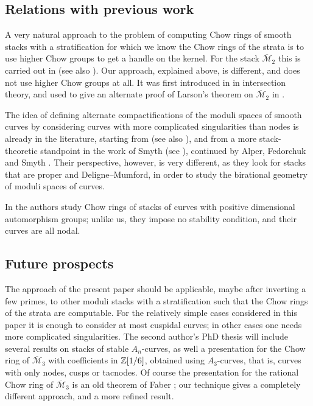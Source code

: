 \documentclass[a4paper, 10pt]{amsart}
\numberwithin{equation}{section}
\numberwithin{subsection}{section}
\theoremstyle{definition}
\theoremstyle{remark}
\renewcommand{\mathcal}{\mathscr}
\newcommand\cM{\mathcal{M}} \newcommand\cN{\mathcal{N}}
\newcommand{\Mbar}{\overline{\cM}}
\begin{document}
	
\subsection*{Relations with previous work} A very natural approach to the problem of computing Chow rings of smooth stacks with a stratification for which we know the Chow rings of the strata is to use higher Chow groups to get a handle on the kernel. For the stack $\Mbar_{2}$ this is carried out in \cite{Lars} (see also \cite{bae-schmitt-1, bae-schmitt-2}). Our approach, explained above, is different, and does not use higher Chow groups at all. It was first introduced in \cite{fulghesu} in intersection theory, and used to give an alternate proof of Larson's theorem on $\Mbar_{2}$ in \cite{DLV}.

The idea of defining alternate compactifications of the moduli spaces of smooth curves by considering curves with more complicated singularities than nodes is already in the literature, starting from \cite{schubert} (see also \cite{hassett-hyeon-1, hassett-hyeon-2}), and from a more stack-theoretic standpoint in the work of Smyth (see \cite{smyth-survey}), continued by Alper, Fedorchuk and Smyth \cite{alper-fedorchuk-smyth-1, alper-fedorchuk-smyth-2, alper-fedorchuk-smyth-3, alper-fedorchuk-smyth-4}. Their perspective, however, is very different, as they look for stacks that are proper and Deligne--Mumford, in order to study the birational geometry of moduli spaces of curves.

In \cite{fulghesu, bae-schmitt-1, bae-schmitt-1} the authors study Chow rings of stacks of curves with positive dimensional automorphism groups; unlike us, they impose no stability condition, and their curves are all nodal.

\subsection*{Future prospects} The approach of the present paper should be applicable, maybe after inverting a few primes, to other moduli stacks with a stratification such that the Chow rings of the strata are computable. For the relatively simple cases considered in this paper it is enough to consider at most cuspidal curves; in other cases one needs more complicated singularities. The second author's PhD thesis will include several results on stacks of stable $A_{n}$-curves, as well a presentation for the Chow ring of $\Mbar_{3}$ with coefficients in $\mathbb{Z}[1/6]$, obtained using $A_{3}$-curves, that is, curves with only nodes, cusps or tacnodes. Of course the presentation for the rational Chow ring of $\Mbar_{3}$ is an old theorem of Faber \cite{Fab1}; our technique gives a completely different approach, and a more refined result.
\end{document}
